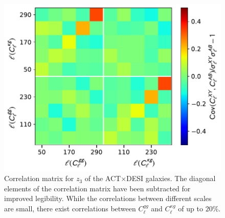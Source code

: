 \documentclass[twocolumn]{aastex631}
\begin{document}
{ \begin{figure}
  \includegraphics[width=\linewidth]{figures/corr_mat.pdf}
  \caption{Correlation matrix for $z_3$ of the ACT$\times$DESI galaxies. The diagonal elements of the correlation matrix have been subtracted for improved legibility. While the correlations between different scales are small, there exist correlations between $C^{gg}_\ell$ and $C^{\kappa{g}}_\ell$ of up to $20\%$.} 
  \label{fig:corr_matrix}
\end{figure}

}
\end{document}
